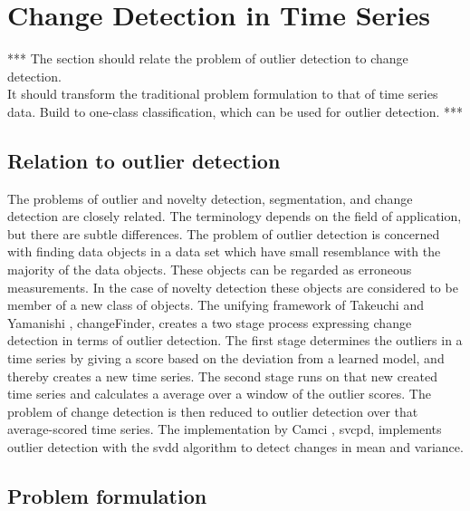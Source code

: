 \section{Change Detection in Time Series}\label{sec:change_detection_time_series}
*** The section should relate the problem of outlier detection to change detection.\\
It should transform the traditional problem formulation to that of time series data.
Build to one-class classification, which can be used for outlier detection. ***

\subsection{Relation to outlier detection}
The problems of outlier and novelty detection, segmentation, and change detection are closely related.
The terminology depends on the field of application, but there are subtle differences.
The problem of outlier detection is concerned with finding data objects in a data set which have small resemblance with the majority of the data objects.
These objects can be regarded as erroneous measurements.
In the case of novelty detection these objects are considered to be member of a new class of objects.
The unifying framework of Takeuchi and Yamanishi \cite{takeuchi2006unifying}, \gls{changeFinder}, creates a two stage process expressing change detection in terms of outlier detection.
The first stage determines the outliers in a time series by giving a score based on the deviation from a learned model, and thereby creates a new time series.
The second stage runs on that new created time series and calculates a average over a window of the outlier scores.
The problem of change detection is then reduced to outlier detection over that average-scored time series.
The implementation by Camci \cite{camci2010change}, \gls{svcpd}, implements outlier detection with the \gls{svdd} algorithm to detect changes in mean and variance.

\subsection{Problem formulation}\label{subsec:change_detection_problem_formulation}


